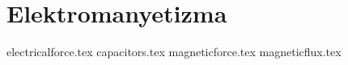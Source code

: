 \section{Elektromanyetizma}

{electricalforce.tex}
{capacitors.tex}
{magneticforce.tex}
{magneticflux.tex}
